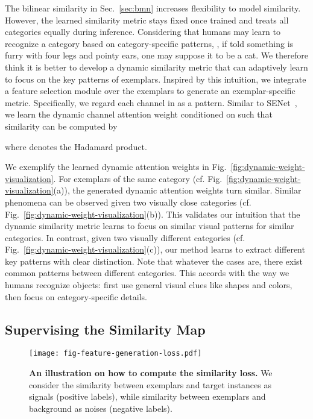 \documentclass[10pt,twocolumn,letterpaper]{article}
\begin{document}
The bilinear similarity in Sec.~\ref{sec:bmn} increases flexibility to model similarity. However, the learned similarity metric stays fixed once trained and treats all categories equally during inference. Considering that humans may learn to recognize a category based on category-specific patterns, \eg, if told something is furry with four legs and pointy ears, one may suppose it to be a cat. We therefore think it is better to develop a dynamic similarity metric that can adaptively learn to focus on the key patterns of exemplars. Inspired by this intuition, we integrate a feature selection module over the exemplars to generate an exemplar-specific metric. 
Specifically, we regard each channel in  as a pattern. Similar to SENet~\cite{senet}, we learn the dynamic channel attention weight  conditioned on  such that similarity  can be computed by

where  denotes the Hadamard product. 

We exemplify the learned dynamic attention weights in Fig.~\ref{fig:dynamic-weight-visualization}. For exemplars of the same category (cf. Fig.~\ref{fig:dynamic-weight-visualization}(a)), the generated dynamic attention weights turn similar. Similar phenomena can be observed given two visually close categories (cf. Fig.~\ref{fig:dynamic-weight-visualization}(b)). This validates our intuition that the dynamic similarity metric learns to focus on similar visual patterns for similar categories. In contrast, given two visually different categories (cf. Fig.~\ref{fig:dynamic-weight-visualization}(c)), our method learns to extract different key patterns with clear distinction. Note that whatever the cases are, there exist common patterns between different categories. This accords with the way we humans recognize objects: first use general visual clues like shapes and colors, then focus on category-specific details. 

\subsection{Supervising the Similarity Map}

\begin{figure}[!t]
  \centering
   \texttt{[image: fig-feature-generation-loss.pdf]}\vspace{-5pt}
   \caption{\textbf{An illustration on how to compute the similarity loss.} We consider the similarity between exemplars and target instances as signals (positive labels), while similarity between exemplars and background as noises (negative labels).}
   \label{fig:feature-generation-loss}
   \vspace{-5pt}
\end{figure}
\end{document}
